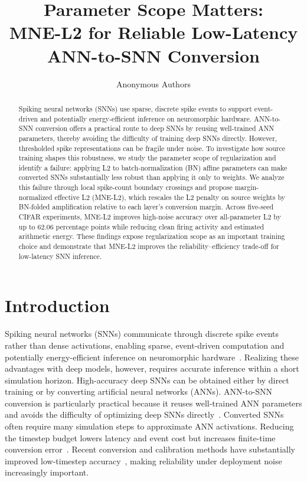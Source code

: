 \documentclass{article}
\title{Parameter Scope Matters:\\
MNE-L2 for Reliable Low-Latency ANN-to-SNN Conversion}
\author{Anonymous Authors}
\begin{document}
\maketitle

\begin{abstract}
Spiking neural networks (SNNs) use sparse, discrete spike events to support event-driven and potentially energy-efficient inference on neuromorphic hardware. ANN-to-SNN conversion offers a practical route to deep SNNs by reusing well-trained ANN parameters, thereby avoiding the difficulty of training deep SNNs directly. However, thresholded spike representations can be fragile under noise. To investigate how source training shapes this robustness, we study the parameter scope of regularization and identify a failure: applying L2 to batch-normalization (BN) affine parameters can make converted SNNs substantially less robust than applying it only to weights. We analyze this failure through local spike-count boundary crossings and propose margin-normalized effective L2 (MNE-L2), which rescales the L2 penalty on source weights by BN-folded amplification relative to each layer's conversion margin. Across five-seed CIFAR experiments, MNE-L2 improves high-noise accuracy over all-parameter L2 by up to $62.06$ percentage points while reducing clean firing activity and estimated arithmetic energy. These findings expose regularization scope as an important training choice and demonstrate that MNE-L2 improves the reliability--efficiency trade-off for low-latency SNN inference.
\end{abstract}

\section{Introduction}

Spiking neural networks (SNNs) communicate through discrete spike events rather than dense activations, enabling sparse, event-driven computation and potentially energy-efficient inference on neuromorphic hardware~\cite{davies2018loihi}. Realizing these advantages with deep models, however, requires accurate inference within a short simulation horizon. High-accuracy deep SNNs can be obtained either by direct training or by converting artificial neural networks (ANNs). ANN-to-SNN conversion is particularly practical because it reuses well-trained ANN parameters and avoids the difficulty of optimizing deep SNNs directly~\cite{rueckauer2017conversion,sengupta2019going}. Converted SNNs often require many simulation steps to approximate ANN activations. Reducing the timestep budget lowers latency and event cost but increases finite-time conversion error~\cite{bu2022optimal}. Recent conversion and calibration methods have substantially improved low-timestep accuracy~\cite{hu2023fast,bu2022optimal}, making reliability under deployment noise increasingly important.
\end{document}
